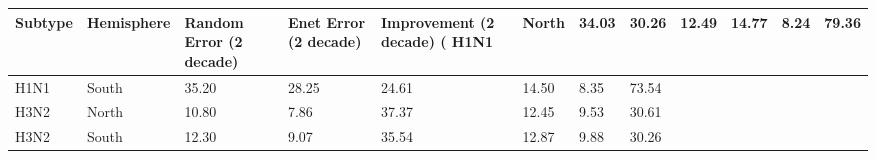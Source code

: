 \begin{tabular}{L{1in}|L{1in}|L{1in}|L{1in}|L{1in}|L{1in}|L{1in}|L{1in}}\hline
Subtype&Hemisphere& Random  Error  (2  decade) & Enet  Error  (2  decade) & Improvement  (2  decade)  (%
H1N1&North&34.03&30.26&12.49&14.77&8.24&79.36\\\hline
H1N1&South&35.20&28.25&24.61&14.50&8.35&73.54\\\hline
H3N2&North&10.80&7.86&37.37&12.45&9.53&30.61\\\hline
H3N2&South&12.30&9.07&35.54&12.87&9.88&30.26\\\hline
\hline\end{tabular}
